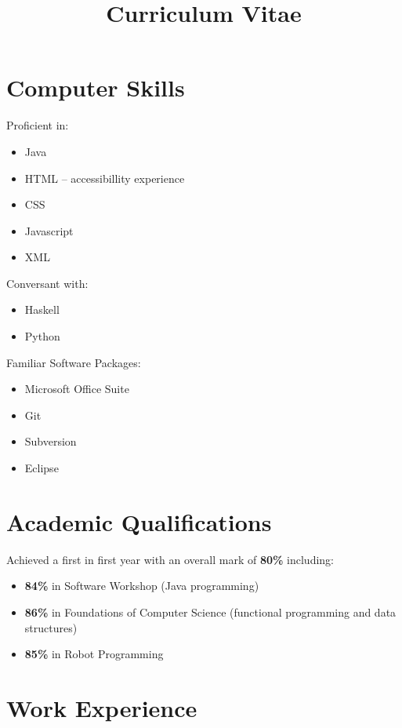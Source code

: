 \documentclass[11pt,a4paper,sans]{moderncv} %
\title{Curriculum Vitae}
\begin{document}
\makecvtitle

\section{Computer Skills}
\begin{multicols}{3}
	Proficient in:
	\begin{itemize}
		\item{Java} 
		\item{HTML -- accessibillity experience}
		\item{CSS} 
		\item{Javascript}
		\item{XML}
	\end{itemize}
\columnbreak
	Conversant with:
	\begin{itemize}
		\item{Haskell}
		\item{Python}
	\end{itemize}
\columnbreak
	Familiar Software Packages:
	\begin{itemize}
		\item{Microsoft Office Suite}
		\item{Git}
		\item{Subversion}
		\item{Eclipse}
	\end{itemize}
\end{multicols}

\section{Academic Qualifications}
{Achieved a first in first year with an overall mark of \textbf{80\%} including:
\begin{itemize}
	\item \textbf{84\%} in Software Workshop (Java programming)
	\item \textbf{86\%} in Foundations of Computer Science (functional programming and data structures)
	\item \textbf{85\%} in Robot Programming
\end{itemize}
}

{}
{}

\section{Work Experience}
\end{document}
